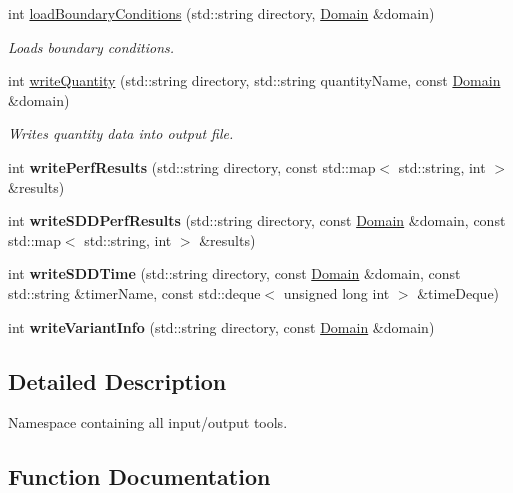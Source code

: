 \begin{DoxyCompactItemize}
int \mbox{\hyperlink{namespaceIO_a7710f22e4bbbd375162154b69289e5e0}{load\+Boundary\+Conditions}} (std\+::string directory, \mbox{\hyperlink{classDomain}{Domain}} \&domain)
\begin{DoxyCompactList}\small\item\em Loads boundary conditions. \end{DoxyCompactList}\item 
int \mbox{\hyperlink{namespaceIO_a98f43edfc02e8c62ca9f005a9994ab69}{write\+Quantity}} (std\+::string directory, std\+::string quantity\+Name, const \mbox{\hyperlink{classDomain}{Domain}} \&domain)
\begin{DoxyCompactList}\small\item\em Writes quantity data into output file. \end{DoxyCompactList}\item 
\mbox{\label{namespaceIO_aa44cb714db9cc88ac6497424ef0892e0}} 
int {\bfseries write\+Perf\+Results} (std\+::string directory, const std\+::map$<$ std\+::string, int $>$ \&results)
\item 
\mbox{\label{namespaceIO_a40ed72b5bd6bb86a441fe4e4722cf9eb}} 
int {\bfseries write\+S\+D\+D\+Perf\+Results} (std\+::string directory, const \mbox{\hyperlink{classDomain}{Domain}} \&domain, const std\+::map$<$ std\+::string, int $>$ \&results)
\item 
\mbox{\label{namespaceIO_a0f8d747d38ee614e50ace488d79ae520}} 
int {\bfseries write\+S\+D\+D\+Time} (std\+::string directory, const \mbox{\hyperlink{classDomain}{Domain}} \&domain, const std\+::string \&timer\+Name, const std\+::deque$<$ unsigned long int $>$ \&time\+Deque)
\item 
\mbox{\label{namespaceIO_a9388e688bab072c402da7a19e5527ead}} 
int {\bfseries write\+Variant\+Info} (std\+::string directory, const \mbox{\hyperlink{classDomain}{Domain}} \&domain)
\end{DoxyCompactItemize}


\subsection{Detailed Description}
Namespace containing all input/output tools. 

\subsection{Function Documentation}
\mbox{\label{namespaceIO_a7710f22e4bbbd375162154b69289e5e0}} 
